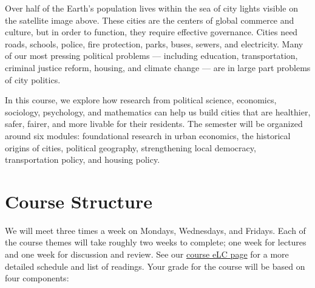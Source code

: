 \documentclass[11pt, letterpaper]{article}
\begin{document}
\noindent Over half of the Earth's population lives within the sea of city lights visible on the satellite image above. These cities are the centers of global commerce and culture, but in order to function, they require effective governance. Cities need roads, schools, police, fire protection, parks, buses, sewers, and electricity. Many of our most pressing political problems --- including education, transportation, criminal justice reform, housing, and climate change --- are in large part problems of city politics.

In this course, we explore how research from political science, economics, sociology, psychology, and mathematics can help us build cities that are healthier, safer, fairer, and more livable for their residents. The semester will be organized around six modules: foundational research in urban economics, the historical origins of cities, political geography, strengthening local democracy, transportation policy, and housing policy. 



\section*{Course Structure}

We will meet three times a week on Mondays, Wednesdays, and Fridays. Each of the course themes will take roughly two weeks to complete; one week for lectures and one week for discussion and review. See our \href{https://uga.view.usg.edu/d2l/home/2935828}{course eLC page} for a more detailed schedule and list of readings. Your grade for the course will be based on four components:
\end{document}
